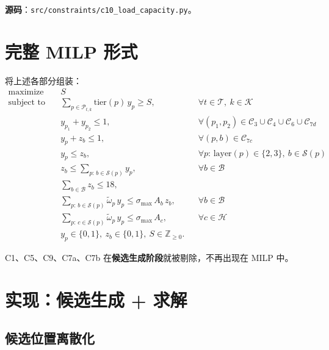\documentclass[a4paper,11pt]{ctexart}
\newcommand{\Z}{\mathbb{Z}}
\newcommand{\B}{\{0,1\}}
\newcommand{\set}[1]{\mathcal{#1}}
\DeclareMathOperator*{\maximize}{maximize}
\DeclareMathOperator*{\subjectto}{subject\ to}
\begin{document}
\textbf{源码}：\texttt{src/constraints/c10\_load\_capacity.py}。

\section{完整 MILP 形式}

将上述各部分组装：
\begin{equation}\label{eq:milp}
\boxed{
\begin{aligned}
\maximize\quad   & S \\
\subjectto\quad
&\sum_{p\in\set{P}_{t,k}} \text{tier}(p)\,y_p \geq S,
   && \forall t\in\set{T},\ k\in\set{K} \tag{C2}\\
&y_{p_1}+y_{p_2}\leq 1, && \forall (p_1,p_2)\in\set{C}_3\cup\set{C}_4\cup\set{C}_6\cup\set{C}_{7d} \tag{C3,4,6,7d}\\
&y_p + z_b \leq 1, && \forall (p,b)\in\set{C}_{7c} \tag{C7c}\\
&y_p \leq z_b,
   && \forall p:\,\text{layer}(p)\in\{2,3\},\ b\in\set{S}(p) \tag{C8b}\\
&z_b \leq \sum_{p:\,b\in\set{S}(p)} y_p,
   && \forall b\in\set{B} \tag{C8c}\\
&\sum_{b\in\set{B}} z_b \leq 18, && \tag{C8a}\\
&\sum_{p:\,b\in\set{S}(p)} \widetilde\omega_p\, y_p
   \leq \sigma_{\max}\, A_b\, z_b,
   && \forall b\in\set{B} \tag{C10a}\\
&\sum_{p:\,c\in\set{S}(p)} \widetilde\omega_p\, y_p
   \leq \sigma_{\max}\, A_c,
   && \forall c\in\set{H} \tag{C10b}\\
& y_p\in\B,\ z_b\in\B,\ S\in\Z_{\geq 0}.
\end{aligned}}
\end{equation}

C1、C5、C9、C7a、C7b 在\textbf{候选生成阶段}就被剔除，不再出现在 MILP 中。

\section{实现：候选生成 + 求解}\label{sec:candidate}

\subsection{候选位置离散化}
\end{document}
